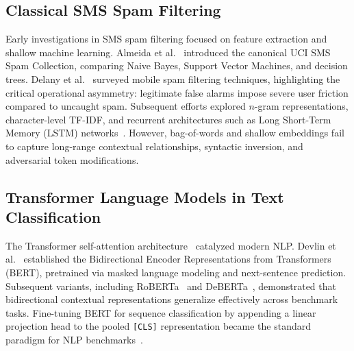 \documentclass[conference]{IEEEtran}
\begin{document}
\subsection{Classical SMS Spam Filtering}
Early investigations in SMS spam filtering focused on feature extraction and shallow machine learning. Almeida et al.~\cite{almeida2011sms} introduced the canonical UCI SMS Spam Collection, comparing Naive Bayes, Support Vector Machines, and decision trees. Delany et al.~\cite{delany2012sms} surveyed mobile spam filtering techniques, highlighting the critical operational asymmetry: legitimate false alarms impose severe user friction compared to uncaught spam. Subsequent efforts explored $n$-gram representations, character-level TF-IDF, and recurrent architectures such as Long Short-Term Memory (LSTM) networks~\cite{hochreiter1997lstm}. However, bag-of-words and shallow embeddings fail to capture long-range contextual relationships, syntactic inversion, and adversarial token modifications.

\subsection{Transformer Language Models in Text Classification}
The Transformer self-attention architecture~\cite{vaswani2017attention} catalyzed modern NLP. Devlin et al.~\cite{devlin2019bert} established the Bidirectional Encoder Representations from Transformers (BERT), pretrained via masked language modeling and next-sentence prediction. Subsequent variants, including RoBERTa~\cite{liu2019roberta} and DeBERTa~\cite{he2020deberta}, demonstrated that bidirectional contextual representations generalize effectively across benchmark tasks. Fine-tuning BERT for sequence classification by appending a linear projection head to the pooled \texttt{[CLS]} representation became the standard paradigm for NLP benchmarks~\cite{wang2018glue}.
\end{document}
